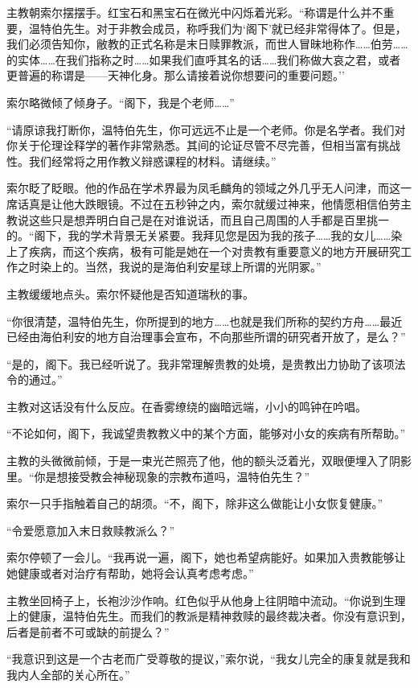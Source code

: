 \documentclass[AutoFakeBold=true]{book}
\begin{document}
主教朝索尔摆摆手。红宝石和黑宝石在微光中闪烁着光彩。``称谓是什么并不重要，温特伯先生。对于非教会成员，称呼我们为`阁下'就已经非常得体了。但是，我们必须告知你，敝教的正式名称是末日赎罪教派，而世人冒昧地称作……伯劳……的实体……在我们指称之时……如果我们直呼其名的话……我们称做大哀之君，或者更普遍的称谓是——天神化身。那么请接着说你想要问的重要问题。''

索尔略微倾了倾身子。``阁下，我是个老师……''

``请原谅我打断你，温特伯先生，你可远远不止是一个老师。你是名学者。我们对你关于伦理诠释学的著作非常熟悉。其间的论证尽管不尽完善，但相当富有挑战性。我们经常将之用作教义辩惑课程的材料。请继续。''

索尔眨了眨眼。他的作品在学术界最为凤毛麟角的领域之外几乎无人问津，而这一席话真是让他大跌眼镜。不过在五秒钟之内，索尔就缓过神来，他情愿相信伯劳主教说这些只是想弄明白自己是在对谁说话，而且自己周围的人手都是百里挑一的。``阁下，我的学术背景无关紧要。我拜见您是因为我的孩子……我的女儿……染上了疾病，而这个疾病，极有可能是她在一个对贵教有重要意义的地方开展研究工作之时染上的。当然，我说的是海伯利安星球上所谓的光阴冢。''

主教缓缓地点头。索尔怀疑他是否知道瑞秋的事。

``你很清楚，温特伯先生，你所提到的地方……也就是我们所称的契约方舟……最近已经由海伯利安的地方自治理事会宣布，不向那些所谓的研究者开放了，是么？''

``是的，阁下。我已经听说了。我非常理解贵教的处境，是贵教出力协助了该项法令的通过。''

主教对这话没有什么反应。在香雾缭绕的幽暗远端，小小的鸣钟在吟唱。

``不论如何，阁下，我诚望贵教教义中的某个方面，能够对小女的疾病有所帮助。''

主教的头微微前倾，于是一束光芒照亮了他，他的额头泛着光，双眼便埋入了阴影里。``你是想接受教会神秘现象的宗教布道吗，温特伯先生？''

索尔一只手指触着自己的胡须。``不，阁下，除非这么做能让小女恢复健康。''

``令爱愿意加入末日救赎教派么？''

索尔停顿了一会儿。``我再说一遍，阁下，她也希望病能好。如果加入贵教能够让她健康或者对治疗有帮助，她将会认真考虑考虑。''

主教坐回椅子上，长袍沙沙作响。红色似乎从他身上往阴暗中流动。``你说到生理上的健康，温特伯先生。而我们的教派是精神救赎的最终裁决者。你没有意识到，后者是前者不可或缺的前提么？''

``我意识到这是一个古老而广受尊敬的提议，''索尔说，``我女儿完全的康复就是我和我内人全部的关心所在。''
\end{document}
